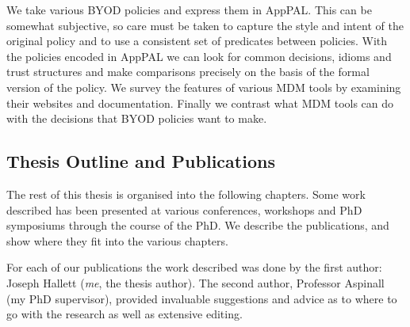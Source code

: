 \documentclass[thesis.tex]{subfiles}
\begin{document}
\begin{itemize}
  We take various \ac{BYOD} policies and express them in AppPAL.  This
  can be somewhat subjective, so care must be taken to capture the style
  and intent of the original policy and to use a consistent set of
  predicates between policies.  With the policies encoded in AppPAL we
  can look for common decisions, idioms and trust structures and make
  comparisons precisely on the basis of the formal version of the
  policy.  We survey the features of various \ac{MDM} tools by examining
  their websites and documentation.  Finally we contrast what \ac{MDM}
  tools can do with the decisions that \ac{BYOD} policies want to make.
\end{itemize}



\subsection{Thesis Outline and Publications}

The rest of this thesis is organised into the following chapters.  Some work
described has been presented at various conferences, workshops and PhD
symposiums through the course of the PhD.  We describe the publications, and
show where they fit into the various chapters.

For each of our publications the work described was done by the first
author: Joseph Hallett (\emph{me}, the thesis author).  The second
author, Professor Aspinall (my PhD supervisor), provided invaluable
suggestions and advice as to where to go with the research as well as
extensive editing.
\end{document}
